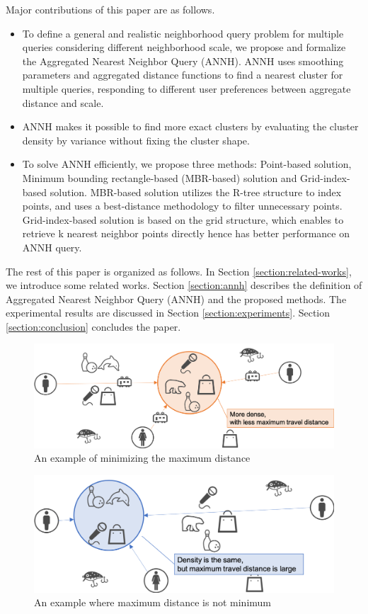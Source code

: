 \documentclass[a4paper,11pt]{report}
\theoremstyle{mytheoremstyle}
\begin{document}
Major contributions of this paper are as follows.
\begin{itemize}
    \item  To define a general and realistic neighborhood query problem for multiple queries considering different neighborhood scale, we propose and formalize the Aggregated Nearest Neighbor Query (ANNH). ANNH uses smoothing parameters and aggregated distance functions to find a nearest cluster for multiple queries, responding to different user preferences between aggregate distance and scale.
  \item ANNH makes it possible to find more exact clusters by evaluating the cluster density by variance without fixing the cluster shape.
  \item To solve ANNH efficiently, we propose three methods: Point-based solution, Minimum bounding rectangle-based (MBR-based) solution and Grid-index-based solution. MBR-based solution utilizes the R-tree\cite{R-tree} structure to index points, and uses a best-distance methodology to filter unnecessary points. Grid-index-based solution is based on the grid structure\cite{BNNH}, which enables to retrieve k nearest neighbor points directly hence has better performance on ANNH query.
\end{itemize}

The rest of this paper is organized as follows. In Section \ref{section:related-works}, we introduce some related works. Section \ref{section:annh} describes the definition of Aggregated Nearest Neighbor Query (ANNH) and the proposed methods. The experimental results are discussed in Section \ref{section:experiments}. Section \ref{section:conclusion} concludes the paper.

\begin{figure}
\includegraphics[width=\textwidth]{images/example-max.png}
\caption{An example of minimizing the maximum distance} \label{fig:example-max}
\end{figure}

\begin{figure}
\includegraphics[width=\textwidth]{images/example-max2.png}
\caption{An example where maximum distance is not minimum} \label{fig:example-max2}
\end{figure}
\end{document}

